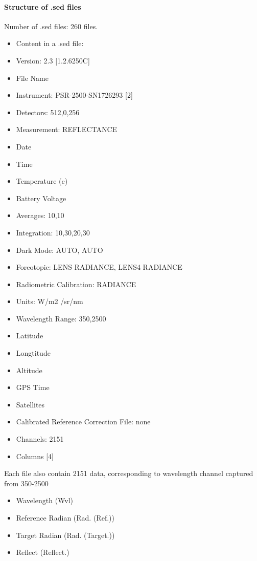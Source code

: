 \paragraph{Structure of .sed files} 
Number of .sed files: 260 files.
\begin{itemize}
    \item Content in a .sed file:
    \item Version: 2.3 [1.2.6250C]
    \item File Name
    \item Instrument: PSR-2500-SN1726293 [2]
    \item Detectors: 512,0,256
    \item Measurement: REFLECTANCE
    \item Date
    \item Time
    \item Temperature (c) 
    \item Battery Voltage
    \item Averages: 10,10
    \item Integration: 10,30,20,30
    \item Dark Mode: AUTO, AUTO
    \item Foreotopic: LENS {RADIANCE}, LENS4 {RADIANCE}
    \item Radiometric Calibration: RADIANCE
    \item Units: W/m2 /sr/nm
    \item Wavelength Range: 350,2500
    \item Latitude
    \item Longtitude
    \item Altitude
    \item GPS Time
    \item Satellites
    \item Calibrated Reference Correction File: none
    \item Channels: 2151
    \item Columns [4]

\end{itemize}

Each file also contain 2151 data, corresponding to wavelength channel captured from 350-2500 
\begin{itemize}
    \item Wavelength (Wvl)
    \item Reference Radian (Rad. (Ref.))
    \item Target Radian (Rad. (Target.))
    \item Reflect (Reflect.)
\end{itemize}

